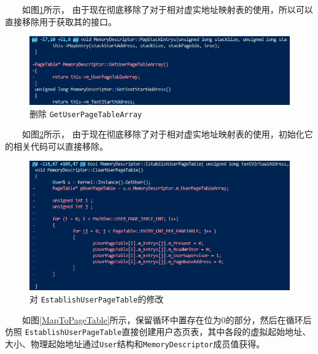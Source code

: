 　　如图\ref{delete}所示，
由于现在彻底移除了对于相对虚实地址映射表的使用，所以可以直接移除用于获取其的接口。

\begin{figure}[!htbp]
    \centering
    \includegraphics[width=\textwidth]{images/delete.png}
    \caption{删除 \texttt{GetUserPageTableArray}}\label{delete}
\end{figure}

　　如图\ref{EstablishUserPageTable}所示，
由于现在彻底移除了对于相对虚实地址映射表的使用，初始化它的相关代码可以直接移除。

\begin{figure}[!htbp]
    \centering
    \includegraphics[width=\textwidth]{images/EstablishUserPageTable.png}
    \caption{对  \texttt{EstablishUserPageTable}的修改}\label{EstablishUserPageTable}
\end{figure}

　　如图\ref{MapToPageTable}所示，保留循环中置存在位为0的部分，然后在循环后仿照 \texttt{EstablishUserPageTable}直接创建用户态页表，其中各段的虚拟起始地址、大小、物理起始地址通过\texttt{User}结构和\texttt{MemoryDescriptor}成员值获得。

